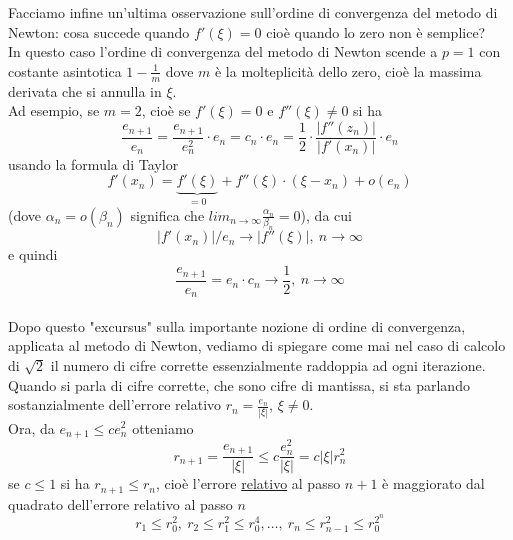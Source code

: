 \documentclass[12pt]{article}
\begin{document}
Facciamo infine un'ultima osservazione sull'ordine di convergenza del metodo di Newton: cosa succede quando  $f'(\xi) = 0$ cioè quando lo zero non è semplice?\\
In questo caso l'ordine di convergenza del metodo di Newton scende a $p=1$ con costante asintotica $1-\frac{1}{m}$ dove $m$ è la molteplicità dello zero, cioè la massima derivata che si annulla in $\xi$.\\
Ad esempio, se $m=2$, cioè se $f'(\xi) = 0$ e $f''(\xi) \neq 0$ si ha
\begin{equation*}
\frac{e_{n+1}}{e_n} = \frac{e_{n+1}}{e_n^2} \cdot e_n = c_n \cdot e_n = \frac{1}{2} \cdot \frac{|f''(z_n)|}{|f'(x_n)|} \cdot e_n
\end{equation*}
usando la formula di Taylor
\begin{equation*}
    f'(x_n)=\underbrace{f'(\xi)}_{=0} + f''(\xi)\cdot (\xi - x_n)+o(e_n)    
\end{equation*}
(dove $\alpha_n = o(\beta_n)$ significa che $lim_{n \to \infty} \frac{\alpha_n}{\beta_n} = 0$), da cui
\begin{equation*}
    |f'(x_n)| / e_n \to |f''(\xi)|, \ n \to \infty
\end{equation*}
e quindi
\begin{equation*}
    \frac{e_{n+1}}{e_n} = e_n \cdot c_n \to \frac{1}{2}, \ n \to \infty
\end{equation*}
\vspace{0.5cm}\\
Dopo questo "excursus" sulla importante nozione di ordine di convergenza, applicata al metodo di Newton, vediamo di spiegare come mai nel caso di calcolo di $\sqrt{2}$ il numero di cifre corrette essenzialmente raddoppia ad ogni iterazione.\\
Quando si parla di cifre corrette, che sono cifre di mantissa, si sta parlando sostanzialmente dell'errore relativo $r_n = \frac{e_n}{|\xi|}$, $\xi \neq 0$.\\
Ora, da $e_{n+1} \leq ce_n^2$ otteniamo 
\begin{equation*}
    r_{n+1} = \frac{e_{n+1}}{|\xi|} \leq c\frac{e_n^2}{|\xi|} = c|\xi|r_n^2
\end{equation*}
se $c \leq 1$ si ha $r_{n+1} \leq r_n$, cioè l'errore \underline{relativo} al passo $n+1$ è maggiorato dal quadrato dell'errore relativo al passo $n$
\begin{equation*}
    r_1 \leq r_0^2, \ r_2 \leq r_1^2 \leq r_0^4, \dots, \ r_n \leq r_{n-1}^2 \leq r_0^{2^n}
\end{equation*}
\end{document}
